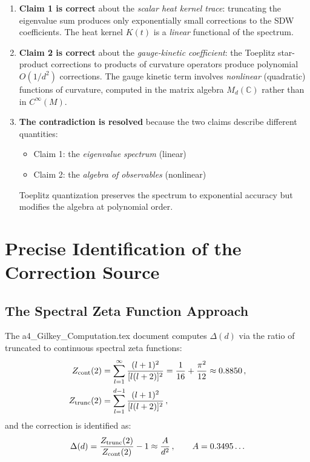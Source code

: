 \documentclass[12pt,a4paper]{article}
\theoremstyle{definition}
\begin{document}
\begin{tcolorbox}[colback=green!5!white, colframe=green!60!black,
  title=\textbf{Resolution Summary}]
\begin{enumerate}
\item \textbf{Claim 1 is correct} about the \emph{scalar heat kernel trace}:
  truncating the eigenvalue sum produces only exponentially small corrections
  to the SDW coefficients.  The heat kernel $K(t)$ is a \emph{linear}
  functional of the spectrum.

\item \textbf{Claim 2 is correct} about the \emph{gauge-kinetic coefficient}:
  the Toeplitz star-product corrections to products of curvature operators
  produce polynomial $O(1/d^2)$ corrections.  The gauge kinetic term
  involves \emph{nonlinear} (quadratic) functions of curvature, computed
  in the matrix algebra $M_d(\mathbb{C})$ rather than in $C^{\infty}(M)$.

\item \textbf{The contradiction is resolved} because the two claims
  describe different quantities:
  \begin{itemize}
  \item Claim 1: the \emph{eigenvalue spectrum} (linear)
  \item Claim 2: the \emph{algebra of observables} (nonlinear)
  \end{itemize}
  Toeplitz quantization preserves the spectrum to exponential accuracy
  but modifies the algebra at polynomial order.
\end{enumerate}
\end{tcolorbox}

\section{Precise Identification of the Correction Source}
\label{sec:precise}

\subsection{The Spectral Zeta Function Approach}

The a4\_Gilkey\_Computation.tex document computes $\Delta(d)$ via the
ratio of truncated to continuous spectral zeta functions:
\begin{align}
Z_{\rm cont}(2) &= \sum_{l=1}^{\infty}\frac{(l+1)^2}{[l(l+2)]^2}
= \frac{1}{16} + \frac{\pi^2}{12} \approx 0.8850\,, \\
Z_{\rm trunc}(2) &= \sum_{l=1}^{d-1}\frac{(l+1)^2}{[l(l+2)]^2}\,,
\end{align}
and the correction is identified as:
\begin{equation}
\Delta(d) = \frac{Z_{\rm trunc}(2)}{Z_{\rm cont}(2)} - 1
\approx \frac{A}{d^2}\,,\qquad A = 0.3495\ldots
\end{equation}
\end{document}
